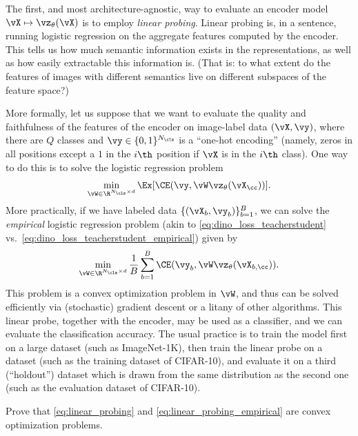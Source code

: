 \documentclass[../../book-main.tex]{subfiles}
\begin{document}
The first, and most architecture-agnostic, way to evaluate an encoder model \(\vX \mapsto \vz_{\theta}(\vX)\) is to employ \textit{linear probing}. Linear probing is, in a sentence, running logistic regression on the aggregate features computed by the encoder. This tells us how much semantic information exists in the representations, as well as how easily extractable this information is. (That is: to what extent do the features of images with different semantics live on different subspaces of the feature space?)

More formally, let us suppose that we want to evaluate the quality and faithfulness of the features of the encoder on image-label data \((\vX, \vy)\), where there are \(Q\) classes and \(\vy \in \{0, 1\}^{N_{\cls}}\) is a ``one-hot encoding'' (namely, zeros in all positions except a \(1\) in the \(i\th\) position if \(\vX\) is in the \(i\th\) class). One way to do this is to solve the logistic regression problem 
\begin{equation}\label{eq:linear_probing}
    \min_{\vW \in \R^{N_{\cls} \times d}}\Ex[\CE(\vy, \vW \vz_{\theta}(\vX_{\cc}))].
\end{equation}
More practically, if we have labeled data \(\{(\vX_{b}, \vy_{b})\}_{b = 1}^{B}\), we can solve the \textit{empirical} logistic regression problem (akin to \eqref{eq:dino_loss_teacherstudent} vs.~\eqref{eq:dino_loss_teacherstudent_empirical}) given by 
\begin{equation}\label{eq:linear_probing_empirical}
    \min_{\vW \in \R^{N_{\cls} \times d}}\frac{1}{B}\sum_{b = 1}^{B}\CE(\vy_{b}, \vW \vz_{\theta}(\vX_{b, \cc})).
\end{equation}
This problem is a convex optimization problem in \(\vW\), and thus can be solved efficiently via (stochastic) gradient descent or a litany of other algorithms. This linear probe, together with the encoder, may be used as a classifier, and we can evaluate the classification accuracy. The usual practice is to train the model first on a large dataset (such as ImageNet-1K), then train the linear probe on a dataset (such as the training dataset of CIFAR-10), and evaluate it on a third (``holdout'') dataset which is drawn from the same distribution as the second one (such as the evaluation dataset of CIFAR-10).

\begin{exercise}
    Prove that \eqref{eq:linear_probing} and \eqref{eq:linear_probing_empirical} are convex optimization problems.
\end{exercise}
\end{document}
